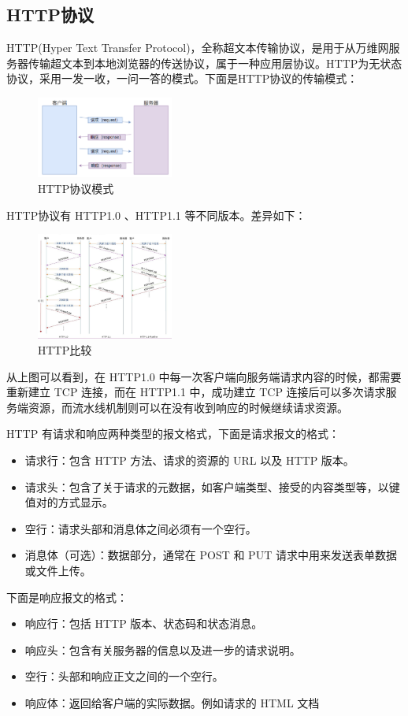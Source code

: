 \documentclass[UTF8,a4paper,10pt]{ctexart}
\begin{document}
\subsection{HTTP协议}
HTTP(Hyper Text Transfer Protocol)，全称超文本传输协议，是用于从万维网服务器传输超文本到本地浏览器的传送协议，属于一种应用层协议。HTTP为无状态协议，采用一发一收，一问一答的模式。下面是HTTP协议的传输模式：
\begin{figure}[H]
    \centering
\includegraphics[width=0.4\textwidth]{img/HTTP协议模式.png}
    \caption{HTTP协议模式}
\end{figure}
HTTP协议有 HTTP1.0 、HTTP1.1 等不同版本。差异如下：
\begin{figure}[H]
    \centering
\includegraphics[width=0.4\textwidth]{img/HTTP比较.png}
    \caption{HTTP比较}
\end{figure}
从上图可以看到，在 HTTP1.0 中每一次客户端向服务端请求内容的时候，都需要重新建立 TCP 连接，而在 HTTP1.1 中，成功建立 TCP 连接后可以多次请求服务端资源，而流水线机制则可以在没有收到响应的时候继续请求资源。\par
\vspace{1cm}
HTTP 有请求和响应两种类型的报文格式，下面是请求报文的格式：
\begin{itemize}
\item 请求行：包含 HTTP 方法、请求的资源的 URL 以及 HTTP 版本。
\item 请求头：包含了关于请求的元数据，如客户端类型、接受的内容类型等，以键值对的方式显示。
\item 空行：请求头部和消息体之间必须有一个空行。
\item 消息体（可选）：数据部分，通常在 POST 和 PUT 请求中用来发送表单数据或文件上传。 
\end{itemize}\par
\vspace{1cm}
下面是响应报文的格式：
\begin{itemize}
\item 响应行：包括 HTTP 版本、状态码和状态消息。
\item 响应头：包含有关服务器的信息以及进一步的请求说明。
\item 空行：头部和响应正文之间的一个空行。
\item 响应体：返回给客户端的实际数据。例如请求的 HTML 文档
\end{itemize}
\end{document}
